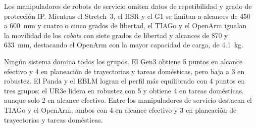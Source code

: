 Los manipuladores de robots de servicio omiten datos de repetibilidad y grado de protección IP. Mientras el Stretch~3, el HSR y el G1 se limitan a alcances de 450 a 600~mm y cuatro o cinco grados de libertad, el TIAGo y el OpenArm igualan la movilidad de los \emph{cobots} con siete grados de libertad y alcances de 870 y 633~mm, destacando el OpenArm con la mayor capacidad de carga, de 4.1~kg.

Ningún sistema domina todos los grupos. El Gen3 obtiene 5 puntos en alcance efectivo y 4 en planeación de trayectorias y tareas domésticas, pero baja a 3 en robustez. El Panda y el EBLM logran el perfil más equilibrado con 4 puntos en tres grupos; el UR3e lidera en robustez con 5 y obtiene 4 en tareas domésticas, aunque solo 2 en alcance efectivo. Entre los manipuladores de servicio destacan el TIAGo y el OpenArm, ambos con 4 en alcance efectivo y 3 en planeación de trayectorias y tareas domésticas.
